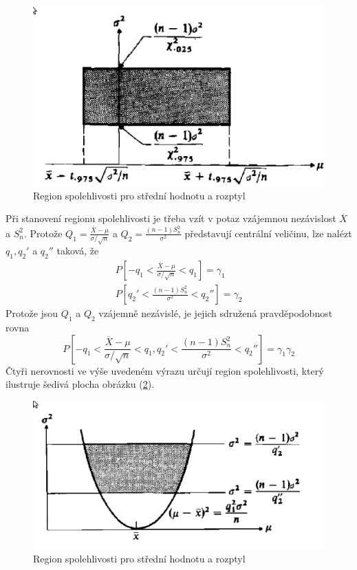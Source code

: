 \begin{figure}[htp]
\centering
\includegraphics[scale = 0.5]{pictures/conf_interval_mu_sigma_a.eps}
\caption{Region spolehlivosti pro střední hodnotu a rozptyl}
\label{conf-interval-mu-sigma_a}
\end{figure}

Při stanovení regionu spolehlivosti je třeba vzít v potaz vzájemnou nezávislost $\overline{X}$ a $S_n^2$. Protože $Q_1 = \frac{\overline{X} - \mu}{\sigma / \sqrt{n}}$ a $Q_2 = \frac{(n - 1)S_n^2}{\sigma^2}$ představují centrální veličinu, lze nalézt $q_1, q_2'$ a $q_2''$ taková, že
\begin{gather*}
P \left[-q_1 < \frac{\overline{X} - \mu}{\sigma / \sqrt{n}} < q_1 \right] = \gamma_1\\
P \left[q_2' < \frac{(n - 1)S_n^2}{\sigma^2} < q_2'' \right] = \gamma_2
\end{gather*}
Protože jsou $Q_1$ a $Q_2$ vzájemně nezávislé, je jejich sdružená pravděpodobnost rovna
\begin{equation*}
P\left[-q_1 < \frac{\overline{X} - \mu}{\sigma / \sqrt{n}} < q_1, q_2' < \frac{(n - 1)S_n^2}{\sigma^2} < q_2'' \right] = \gamma_1 \gamma_2
\end{equation*}
Čtyři nerovnosti ve výše uvedeném výrazu určují region spolehlivosti, který ilustruje šedivá plocha obrázku (\ref{conf-interval-mu-sigma_b}).

\begin{figure}[htp]
\centering
\includegraphics[scale = 0.5]{pictures/conf_interval_mu_sigma_b.eps}
\caption{Region spolehlivosti pro střední hodnotu a rozptyl}
\label{conf-interval-mu-sigma_b}
\end{figure}

